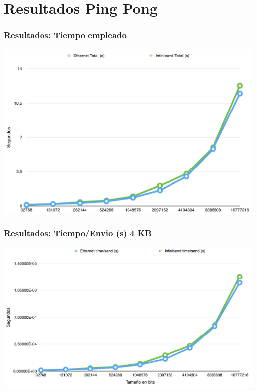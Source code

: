 \documentclass[10pt]{beamer}
\begin{document}
\section{Resultados Ping Pong}
\begin{frame}[fragile]
\frametitle{Resultados: Tiempo empleado}
\begin{center}
\includegraphics[scale=0.42]{1.png}
\end{center}
\end{frame}
\begin{frame}[fragile]
\frametitle{Resultados: Tiempo/Envio (s) 4 KB}
\begin{center}
\includegraphics[scale=0.42]{2.png}
\end{center}
\end{frame}
\end{document}
